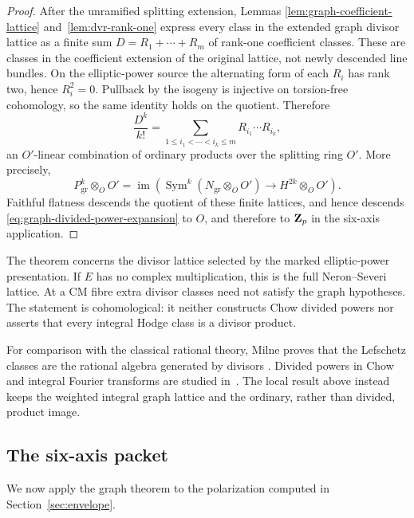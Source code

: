 \begin{proof}
After the unramified splitting extension, Lemmas
\ref{lem:graph-coefficient-lattice} and~\ref{lem:dvr-rank-one} express every
class in the extended graph divisor lattice as a finite sum
\(D=R_1+\cdots+R_m\) of rank-one coefficient classes.  These are classes in
the coefficient extension of the original lattice, not newly descended line
bundles.  On the elliptic-power source the alternating form of each \(R_i\)
has rank two, hence \(R_i^2=0\).  Pullback by the isogeny is injective on
torsion-free cohomology, so the same identity holds on the quotient.
Therefore
\[
 \frac{D^k}{k!}=\sum_{1\leq i_1<\cdots<i_k\leq m}
 R_{i_1}\cdots R_{i_k},
 \tag{3.10}
 \label{eq:graph-divided-power-expansion}
\]
an \(O'\)-linear combination of ordinary products over the splitting ring
\(O'\).  More precisely,
\[
 P_{\mathrm{gr}}^k\otimes_OO'
 =\operatorname{im}\!\left(
 \operatorname{Sym}^k(N_{\mathrm{gr}}\otimes_OO')
 \longrightarrow H^{2k}\otimes_OO'\right).
\]
Faithful flatness descends the quotient of these finite lattices, and hence
descends \eqref{eq:graph-divided-power-expansion} to \(O\), and therefore to
\(\mathbf Z_p\) in the six-axis application.
\end{proof}

The theorem concerns the divisor lattice selected by the marked
elliptic-power presentation.  If \(E\) has no complex multiplication, this
is the full Neron--Severi lattice.  At a CM fibre extra divisor classes need
not satisfy the graph hypotheses.  The statement is cohomological: it
neither constructs Chow divided powers nor asserts that every integral Hodge
class is a divisor product.

For comparison with the classical rational theory, Milne proves that the
Lefschetz classes are the rational algebra generated by divisors
\cite[Theorem~3.2]{MilneLefschetz}.  Divided powers in Chow and integral
Fourier transforms are studied in~\cite{MoonenPolishchuk,BdGF}.  The local
result above instead keeps the weighted integral graph lattice and the
ordinary, rather than divided, product image.

\subsection{The six-axis packet}

We now apply the graph theorem to the polarization computed in
Section~\ref{sec:envelope}.

